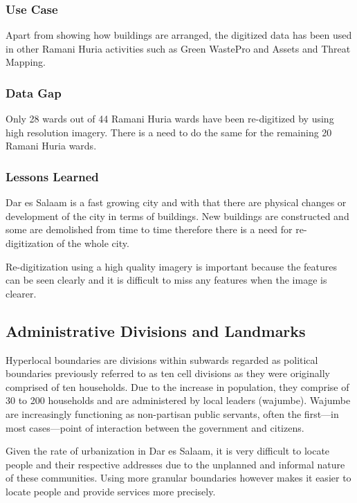 \documentclass[a4paper,12pt,twoside]{article}
\begin{document}
\subsubsection{Use Case}
Apart from showing how buildings are arranged, the digitized data has been used in other Ramani Huria activities such as Green WastePro and Assets and Threat Mapping.

\subsubsection{Data Gap}
Only 28 wards out of 44 Ramani Huria wards have been re-digitized by using high resolution imagery. There is a need to do the same for the remaining 20 Ramani Huria wards.
\subsubsection{Lessons Learned}
Dar es Salaam is a fast growing city and with that there are physical changes or development of the city in terms of buildings. New buildings are constructed and some are demolished from time to time therefore there is a need for re-digitization of the whole city.
\medskip

Re-digitization using a high quality imagery is important because the features can be seen clearly and it is difficult to miss any features when the image is clearer.

\newpage
\subsection{Administrative Divisions and Landmarks}
Hyperlocal boundaries are divisions within subwards regarded as political boundaries previously referred to as ten cell divisions as they were originally comprised of ten households.
Due to the increase in population, they comprise of 30 to 200 households and are administered by local leaders (wajumbe). Wajumbe are increasingly functioning as non-partisan public servants, often the first---in most cases---point of interaction between the government and citizens.
\medskip

Given the rate of urbanization in Dar es Salaam, it is very difficult to locate people and their respective addresses due to the unplanned and informal nature of these communities. Using more granular boundaries however makes it easier to locate people and provide services more precisely. 
\end{document}
